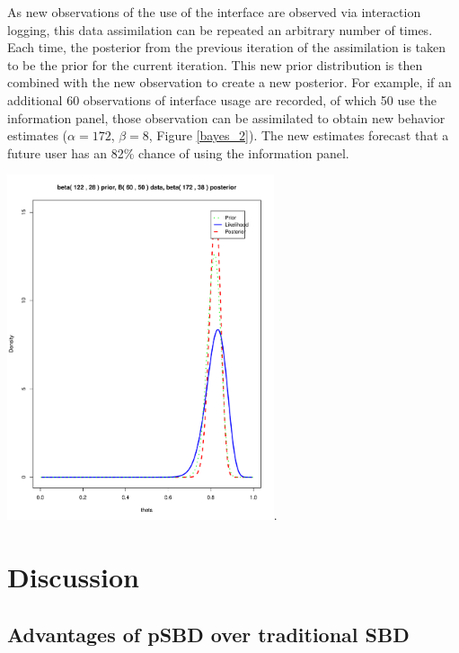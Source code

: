 \documentclass[]{article}
\begin{document}
As new observations of the use of the interface are observed via
interaction logging, this data assimilation can be repeated an arbitrary
number of times. Each time, the posterior from the previous iteration of
the assimilation is taken to be the prior for the current iteration.
This new prior distribution is then combined with the new observation to
create a new posterior. For example, if an additional 60 observations of
interface usage are recorded, of which 50 use the information panel,
those observation can be assimilated to obtain new behavior estimates
(\(\alpha=172\), \(\beta=8\), Figure \ref{bayes_2}). The new estimates
forecast that a future user has an 82\% chance of using the information
panel.

\includegraphics[height=4.00000in]{./iter_2_posterior.pdf}.

\section{Discussion}\label{discussion}

\subsection{Advantages of pSBD over traditional
SBD}\label{advantages-of-psbd-over-traditional-sbd}
\end{document}
